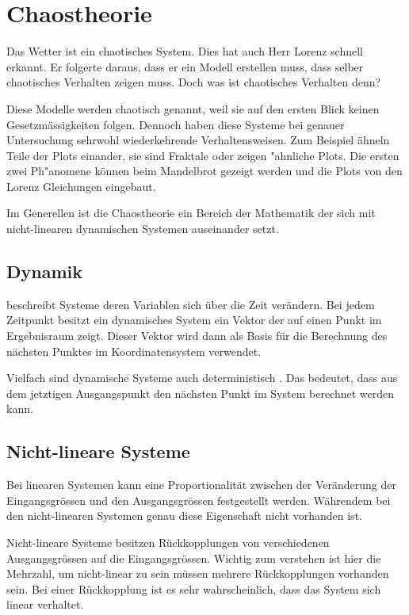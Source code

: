 
\section{Chaostheorie}
Das Wetter ist ein chaotisches System. Dies hat auch Herr Lorenz schnell erkannt. Er folgerte daraus, dass er ein Modell erstellen muss, dass selber chaotisches Verhalten zeigen muss. Doch was ist chaotisches Verhalten denn?

Diese Modelle werden chaotisch genannt, weil sie auf den ersten Blick keinen Gesetzmässigkeiten folgen. Dennoch haben diese Systeme bei genauer Untersuchung sehrwohl wiederkehrende Verhaltensweisen. Zum Beispiel ähneln Teile der Plots einander, sie sind Fraktale oder zeigen "ahnliche Plots. Die ersten zwei Ph"anomene können beim Mandelbrot gezeigt werden \cite{Gleick} und die Plots von den Lorenz Gleichungen eingebaut.

Im Generellen ist die Chaostheorie ein Bereich der Mathematik der sich mit nicht-linearen dynamischen Systemen auseinander setzt.

\subsection{Dynamik} beschreibt Systeme deren Variablen sich über die Zeit verändern. Bei jedem Zeitpunkt besitzt ein dynamisches System ein Vektor der auf einen Punkt im Ergebnisraum zeigt. Dieser Vektor wird dann als Basis für die Berechnung des nächsten Punktes im Koordinatensystem verwendet.

Vielfach sind dynamische Systeme auch deterministisch \cite{https://en.wikipedia.org/wiki/Dynamical_system}. Das bedeutet, dass aus dem jetztigen Ausgangspunkt den nächsten Punkt im System berechnet werden kann.


\subsection{Nicht-lineare Systeme} %
Bei linearen Systemen kann eine Proportionalität zwischen der Veränderung der Eingangsgrössen und den Ausgangsgrössen festgestellt werden. Währendem bei den nicht-linearen Systemen genau diese Eigenschaft nicht vorhanden ist.

Nicht-lineare Systeme besitzen Rückkopplungen von verschiedenen Ausgangsgrössen auf die Eingangsgrössen. Wichtig zum verstehen ist hier die Mehrzahl, um nicht-linear zu sein müssen mehrere Rückkopplungen vorhanden sein. Bei einer Rückkopplung ist es sehr wahrscheinlich, dass das System sich linear verhaltet.

